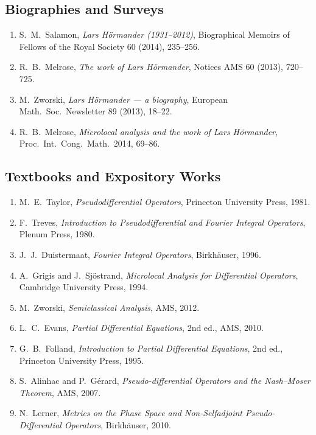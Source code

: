 \subsection*{Biographies and Surveys}
\begin{enumerate}
    \item S.\ M.\ Salamon, \textit{Lars H\"ormander (1931--2012)},
    Biographical Memoirs of Fellows of the Royal Society 60 (2014),
    235--256.
    \item R.\ B.\ Melrose, \textit{The work of Lars H\"ormander},
    Notices AMS 60 (2013), 720--725.
    \item M.\ Zworski, \textit{Lars H\"ormander --- a biography},
    European Math.\ Soc.\ Newsletter 89 (2013), 18--22.
    \item R.\ B.\ Melrose, \textit{Microlocal analysis and the work of
    Lars H\"ormander}, Proc.\ Int.\ Cong.\ Math.\ 2014, 69--86.
\end{enumerate}

\subsection*{Textbooks and Expository Works}
\begin{enumerate}
    \item M.\ E.\ Taylor, \textit{Pseudodifferential Operators},
    Princeton University Press, 1981.
    \item F.\ Treves, \textit{Introduction to Pseudodifferential and
    Fourier Integral Operators}, Plenum Press, 1980.
    \item J.\ J.\ Duistermaat, \textit{Fourier Integral Operators},
    Birkh\"auser, 1996.
    \item A.\ Grigis and J.\ Sj\"ostrand, \textit{Microlocal Analysis
    for Differential Operators}, Cambridge University Press, 1994.
    \item M.\ Zworski, \textit{Semiclassical Analysis}, AMS, 2012.
    \item L.\ C.\ Evans, \textit{Partial Differential Equations},
    2nd ed., AMS, 2010.
    \item G.\ B.\ Folland, \textit{Introduction to Partial Differential
    Equations}, 2nd ed., Princeton University Press, 1995.
    \item S.\ Alinhac and P.\ G\'erard, \textit{Pseudo-differential
    Operators and the Nash--Moser Theorem}, AMS, 2007.
    \item N.\ Lerner, \textit{Metrics on the Phase Space and
    Non-Selfadjoint Pseudo-Differential Operators}, Birkh\"auser, 2010.
\end{enumerate}

